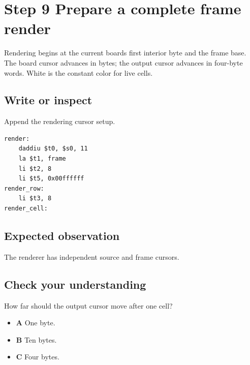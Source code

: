 \section{Step 9 Prepare a complete frame
  render}\label{008-life-generations-s09-step-9-prepare-a-complete-frame-render}

Rendering begins at the current board\textquotesingle s first interior
byte and the frame base. The board cursor advances in bytes; the output
cursor advances in four-byte words. White is the constant color for live
cells.

\subsection{Write or
  inspect}\label{008-life-generations-s09-write-or-inspect}

Append the rendering cursor setup.

\begin{verbatim}
render:
    daddiu $t0, $s0, 11
    la $t1, frame
    li $t2, 8
    li $t5, 0x00ffffff
render_row:
    li $t3, 8
render_cell:
\end{verbatim}

\subsection{Expected
  observation}\label{008-life-generations-s09-expected-observation}

The renderer has independent source and frame cursors.

\subsection{Check your
  understanding}\label{008-life-generations-s09-check-your-understanding}

How far should the output cursor move after one cell?

\begin{itemize}
  \tightlist
  \item
        \textbf{A} One byte.
  \item
        \textbf{B} Ten bytes.
  \item
        \textbf{C} Four bytes.
\end{itemize}
